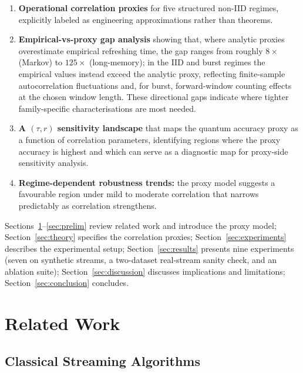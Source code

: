 \documentclass[preprint,12pt,authoryear]{elsarticle}
\begin{document}
\begin{enumerate}
    \item \textbf{Operational correlation proxies} for five structured non\nobreakdash-IID regimes, explicitly labeled as engineering approximations rather than theorems.

    \item \textbf{Empirical-vs-proxy gap analysis} showing that, where analytic proxies overestimate empirical refreshing time, the gap ranges from roughly $8\times$ (Markov) to $125\times$ (long-memory); in the IID and burst regimes the empirical values instead exceed the analytic proxy, reflecting finite\nobreakdash-sample autocorrelation fluctuations and, for burst, forward\nobreakdash-window counting effects at the chosen window length. These directional gaps indicate where tighter family-specific characterisations are most needed.

    \item \textbf{A $(\tau, r)$ sensitivity landscape} that maps the quantum accuracy proxy as a function of correlation parameters, identifying regions where the proxy accuracy is highest and which can serve as a diagnostic map for proxy-side sensitivity analysis.

    \item \textbf{Regime-dependent robustness trends:} the proxy model suggests a favourable region under mild to moderate correlation that narrows predictably as correlation strengthens.
\end{enumerate}

Sections~\ref{sec:related}--\ref{sec:prelim} review related work and introduce the proxy model; Section~\ref{sec:theory} specifies the correlation proxies; Section~\ref{sec:experiments} describes the experimental setup; Section~\ref{sec:results} presents nine experiments (seven on synthetic streams, a two\nobreakdash-dataset real-stream sanity check, and an ablation suite); Section~\ref{sec:discussion} discusses implications and limitations; Section~\ref{sec:conclusion} concludes.


\section{Related Work}
\label{sec:related}

\subsection{Classical Streaming Algorithms}
\end{document}
